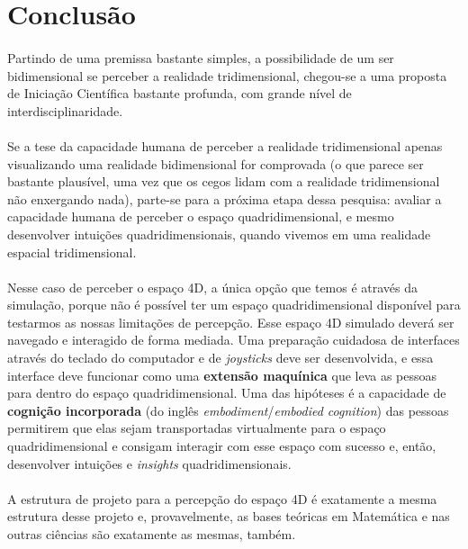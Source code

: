 \documentclass{article}
\begin{document}
	\section{Conclusão} \label{c}
	
	\paragraph{}
	Partindo de uma premissa bastante simples, a possibilidade de um ser bidimensional se perceber a realidade tridimensional, chegou-se a uma proposta de Iniciação Científica bastante profunda, com grande nível de interdisciplinaridade.
	
	\paragraph{}
	Se a tese da capacidade humana de perceber a realidade tridimensional apenas visualizando uma realidade bidimensional for comprovada (o que parece ser bastante plausível, uma vez que os cegos lidam com a realidade tridimensional não enxergando nada), parte-se para a próxima etapa dessa pesquisa: avaliar a capacidade humana de perceber o espaço quadridimensional, e mesmo desenvolver intuições quadridimensionais, quando vivemos em uma realidade espacial tridimensional.
	
	\paragraph{}
	Nesse caso de perceber o espaço 4D, a única opção que temos é através da simulação, porque não é possível ter um espaço quadridimensional disponível para testarmos as nossas limitações de percepção. Esse espaço 4D simulado deverá ser navegado e interagido de forma mediada. Uma preparação cuidadosa de interfaces através do teclado do computador e de \textit{joysticks} deve ser desenvolvida, e essa interface deve funcionar como uma \textbf{extensão maquínica} que leva as pessoas para dentro do espaço quadridimensional. Uma das hipóteses é a capacidade de \textbf{cognição incorporada} (do inglês \textit{embodiment}/\textit{embodied cognition}) das pessoas permitirem que elas sejam transportadas virtualmente para o espaço quadridimensional e consigam interagir com esse espaço com sucesso e, então, desenvolver intuições e \textit{insights} quadridimensionais.
	
	\paragraph{}
	A estrutura de projeto para a percepção do espaço 4D é exatamente a mesma estrutura desse projeto e, provavelmente, as bases teóricas em Matemática e nas outras ciências são exatamente as mesmas, também.
	
\end{document}
